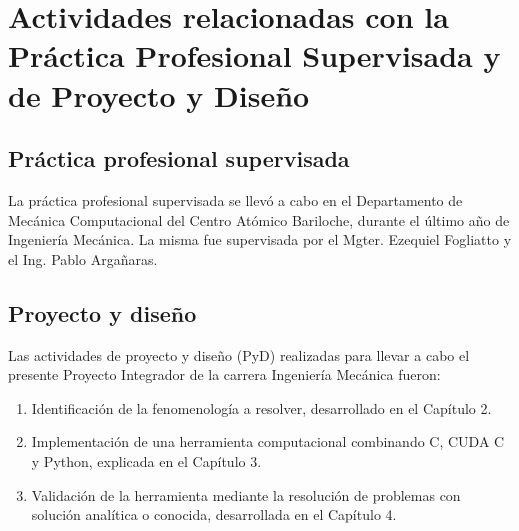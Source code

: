 \chapter{Actividades relacionadas con la Práctica Profesional Supervisada y de Proyecto y Diseño}


\section{Práctica profesional supervisada}

La práctica profesional supervisada se llevó a cabo en el Departamento de Mecánica Computacional del Centro Atómico Bariloche, durante el último año de Ingeniería Mecánica. La misma fue supervisada por el Mgter. Ezequiel Fogliatto y el Ing. Pablo Argañaras.


\section{Proyecto y diseño}

Las actividades de proyecto y diseño (PyD) realizadas para llevar a cabo el presente Proyecto Integrador de la carrera Ingeniería Mecánica fueron:

\begin{enumerate}
	\item 	Identificación de la fenomenología a resolver, desarrollado en el Capítulo 2.
	\item   Implementación de una herramienta computacional combinando C, CUDA C y Python, explicada en el Capítulo 3.	
	\item   Validación de la herramienta mediante la resolución de problemas con solución analítica o conocida, desarrollada en el Capítulo 4.
	
\end{enumerate}
